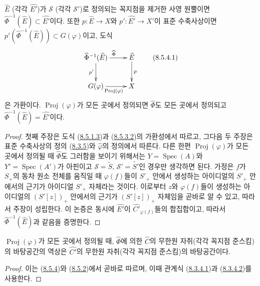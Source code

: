 \begin{proposition}[8.5.4]
\label{II.8.5.4-ko}
$\widehat{E}$ (각각 $\widehat{E'}$)가 $\mathcal{S}$
(각각 $\mathcal{S}'$)로 정의되는 꼭지점을 제거한 사영 원뿔이면
$\widehat{\Phi}^{-1}(\widehat{E})\subset\widehat{E'}$이다. 또한
$p:\widehat{E}\to X$와 $p':\widehat{E'}\to X'$이 표준 수축사상이면
$p'(\widehat{\Phi}^{-1}(\widehat{E}))\subset G(\varphi)$이고, 도식
\begin{equation}
\label{II.8.5.4.1-ko}
  \xymatrix{
    \widehat{\Phi}^{-1}(\widehat{E})
      \ar[r]^{\widehat{\Phi}}\ar[d]_{p'} &
    \widehat{E}\ar[d]^{p}\\
    G(\varphi)\ar[r]_{\operatorname{Proj}(\varphi)} & X
  }
\tag{8.5.4.1}
\end{equation}
은 가환이다. $\operatorname{Proj}(\varphi)$가 모든 곳에서 정의되면
$\widehat{\Phi}$도 모든 곳에서 정의되고
$\widehat{\Phi}^{-1}(\widehat{E})=\widehat{E'}$이다.
\end{proposition}

\begin{proof}
첫째 주장은 도식 (\hyperref[II.8.5.1.3-ko]{8.5.1.3})과
(\hyperref[II.8.5.3.2-ko]{8.5.3.2})의 가환성에서 따르고, 그다음 두
주장은 표준 수축사상의 정의 (\hyperref[II.8.3.5-ko]{8.3.5})와
$\widehat{\varphi}$의 정의에서 따른다. 다른 한편
$\operatorname{Proj}(\varphi)$가 모든 곳에서 정의될 때
$\widehat{\Phi}$도 그러함을 보이기 위해서는
$Y=\operatorname{Spec}(A)$와 $Y'=\operatorname{Spec}(A')$가 아핀이고
$\mathcal{S}=\widetilde{S}$,
$\mathcal{S}'=\widetilde{S'}$인 경우만 생각하면 된다. 가정은 $f$가
$S_+$의 동차 원소 전체를 움직일 때 $\varphi(f)$들이 $S'_+$ 안에서
생성하는 아이디얼의 $S'_+$ 안에서의 근기가 아이디얼 $S'_+$ 자체라는
것이다. 이로부터 $z$와 $\varphi(f)$들이 생성하는 아이디얼의
$(S'[z])_+$ 안에서의 근기가 $(S'[z])_+$ 자체임을 곧바로 알 수 있고,
따라서 주장이 성립한다. 이 논증은 동시에 $\widehat{E'}$이
$\widehat{C'}_{\varphi(f)}$들의 합집합이고, 따라서
$\widehat{\Phi}^{-1}(\widehat{E})$과 같음을 증명한다.
\end{proof}

\begin{corollary}[8.5.5]
\label{II.8.5.5-ko}
$\operatorname{Proj}(\varphi)$가 모든 곳에서 정의될 때,
$\widehat{\Phi}$에 의한 $\widehat{C}$의 무한원 자취(각각 꼭지점
준스킴)의 바탕공간의 역상은 $\widehat{C'}$의 무한원 자취(각각
꼭지점 준스킴)의 바탕공간이다.
\end{corollary}

\begin{proof}
이는 (\hyperref[II.8.5.4-ko]{8.5.4})와
(\hyperref[II.8.5.2-ko]{8.5.2})에서 곧바로 따르며, 이때 관계식
(\hyperref[II.8.3.4.1-ko]{8.3.4.1})과
(\hyperref[II.8.3.4.2-ko]{8.3.4.2})를 사용한다.
\end{proof}

